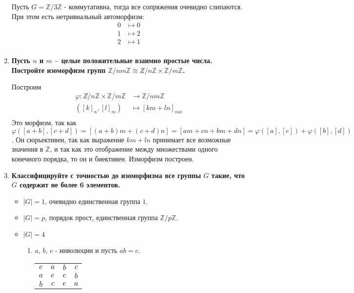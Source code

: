 \documentclass{article}
\begin{document}
\begin{enumerate}
        Пусть $G=\mathbb{Z}/3\mathbb{Z}$ - коммутативна, тогда все сопряжения
        очевидно слипаются. При этом есть нетривиальный автоморфизм:
        \begin{align*}
            0&\mapsto 0\\
            1&\mapsto 2\\
            2&\mapsto 1\\
        \end{align*}
    \item \textbf{Пусть $n$ и $m$ – целые положительные взаимно простые числа.
        Постройте изоморфизм групп $\mathbb{Z}/nm\mathbb{Z}\cong Z/n\mathbb{Z}
        \times\mathbb{Z}/m\mathbb{Z}$.}

        Построим
        \begin{align*}
            \varphi:Z/n\mathbb{Z}\times\mathbb{Z}/m\mathbb{Z}&\longrightarrow\mathbb{Z}/nm\mathbb{Z}\\
            ([k]_n,[l]_m)&\mapsto [km+ln]_{mn}\\
        \end{align*}
        Это морфизм, так как $\varphi([a+b],[c+d])=[(a+b)m+(c+d)n]=[am+cn+bm+dn]
        =\varphi([a],[c])+\varphi([b],[d])$. Он сюрьективен, так как выражение
        $km+ln$ принимает все возможные значения в $\mathbb{Z}$, и так как это
        отображение между множествами одного конечного порядка, то он и биективен.
        Изморфизм построен.
    \item \textbf{Классифицируйте с точностью до изоморфизма все группы $G$
        такие, что $G$ содержит не более 6 элементов.}
        \begin{itemize}
            \item $|G|=1$, очевидно единственная группа $1$.
            \item $|G|=p$, порядок прост, единственная группа $\mathbb{Z}/p\mathbb{Z}$.
            \item $|G|=4$
                \begin{enumerate}
                    \item $a$, $b$, $c$ - инволюции и пусть $ab=c$.\\
                            \noindent\begin{tabular}{c | c c c}
                                $e$ & $a$ & $b$ & $c$  \\
                                \cline{1-4}
                                $a$ & $e$ & $c$ & $b$ \\
                                $b$ & $c$ & $e$ & $a$ \\

\end{tabular}
\end{enumerate}
\end{itemize}
\end{enumerate}
\end{document}
